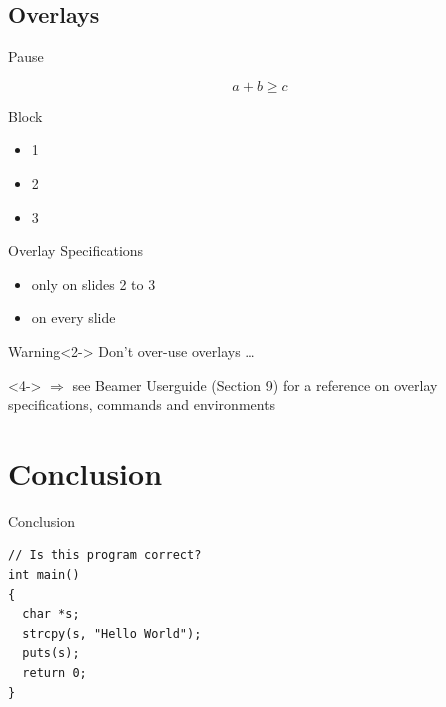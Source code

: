 \documentclass[xcolor={dvipsnames}]{beamer}
\begin{document}
  \subsection{Overlays}

  \begin{frame}{Pause}
    \begin{example}
      \begin{equation}
        a + b \geq c
      \end{equation}
    \end{example}
    \pause
    \begin{block}{Block}
      \begin{itemize}
        \item 1
          \pause
        \item 2
        \item 3
      \end{itemize}
    \end{block}
  \end{frame}

  \begin{frame}{Overlay Specifications}
    \begin{itemize}
      \item<2-3> only on slides 2 to 3
      \item<1-> on every slide
    \end{itemize}
    \begin{block}{Warning}<2->
      \alert{Don't over-use overlays \dots}
    \end{block}
    \vspace{3em}
    \begin{onlyenv}<4->
      $\Rightarrow$ see Beamer Userguide (Section 9) for a reference on overlay
      specifications, commands and environments
    \end{onlyenv}
  \end{frame}

\section{Conclusion}

\begin{frame}[fragile]{Conclusion}
  \begin{lstlisting}
// Is this program correct?
int main()
{
  char *s;
  strcpy(s, "Hello World");
  puts(s);
  return 0;
}
\end{lstlisting}
\end{frame}
\end{document}
